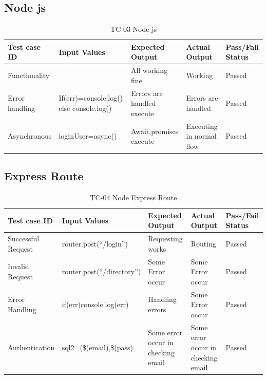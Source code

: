 \documentclass[12pt,a4paper]{article}
\begin{document}
    
    \subsection{Node js}
    \begin{table}[h]
\caption{TC-03 Node js}
    \centering
    \begin{tabular}{|p{9em}|p{9em}|p{4em}|p{4em}|p{4em}|}
    \hline
   \textbf{Test case ID}&\textbf{Input Values}&\textbf{Expected Output}
&\textbf{Actual Output}
&\textbf{Pass/Fail Status} \\%
       \hline
   Functionality  &&All working fine&Working&Passed\\
    \hline
    Error handling&If(err)=console.log() else console.log()&Errors are handled execute&Errors are handled&Passed\\
    \hline
     Asynchronous&loginUser=async()&Await,promises execute&Executing in normal flow&Passed\\
    \hline
    \end{tabular} 
    \end{table}


\newpage
\subsection{Express Route}
\begin{table}[h]
\caption{TC-04 Node Express Route}
\centering
\begin{tabular}{|p{9em}|p{9em}|p{4em}|p{4em}|p{4em}|}
\hline
\textbf{Test case ID}&\textbf{Input Values}&\textbf{Expected Output}
&\textbf{Actual Output}
&\textbf{Pass/Fail Status} \\%
\hline
Successful Request&router.post(“/login”)&Requesting works&Routing &Passed\\
\hline
Invalid Request&router\newline.post(“/directory”)&Some Error occur&Some Error occur&Passed\\
\hline
Error Handling&if(err){console.log(err)}
&Handling errors&Some Error occur&Passed\\
\hline
Authentication&sql2=(\$(email),\$(pass)&Some error occur in checking email&Some error occur in checking email&Passed\\
\hline
\end{tabular} 
\end{table}
\end{document}
